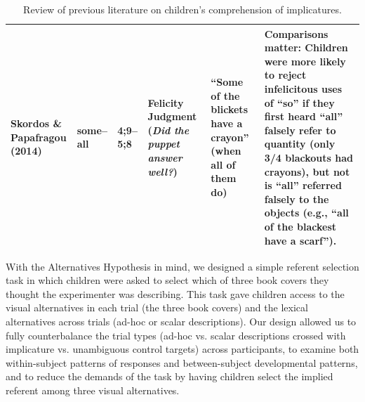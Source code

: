 \documentclass[man]{apa2}
\begin{document}
\begin{landscape}
\begin{table}[!ht]
\begin{tabular}{| p{2.2cm} | p{2cm} | p{1.69cm} | p{4.5cm} | p{5cm} | p{7.2cm} |}
\parbox[t]{2.2cm}{Skordos \&\\Papafragou (2014)} & some--all & 4;9--5;8 & Felicity Judgment (\textit{Did the puppet answer well?}) & ``Some of the blickets have a crayon'' (when all of them do)  & Comparisons matter: Children were more likely to reject infelicitous uses of ``so'' if they first heard ``all'' falsely refer to quantity (only 3/4 blackouts had crayons), but not is ``all'' referred falsely to the objects (e.g., ``all of the blackest have a scarf'').\\ \hline \end{tabular} 
\caption{\label{tab:lit_review}Review of previous literature on children's comprehension of implicatures.} 
\end{table}
\end{landscape}
\restoregeometry


With the Alternatives Hypothesis in mind, we designed a simple referent selection task in which children were asked to select which of three book covers they thought the experimenter was describing. This task gave children access to the visual alternatives in each trial (the three book covers) and the lexical alternatives across trials (ad-hoc or scalar descriptions). Our design allowed us to fully counterbalance the trial types (ad-hoc vs. scalar descriptions crossed with implicature vs. unambiguous control targets) across participants, to examine both within-subject patterns of responses and between-subject developmental patterns, and to reduce the demands of the task by having children select the implied referent among three visual alternatives.
\end{document}

